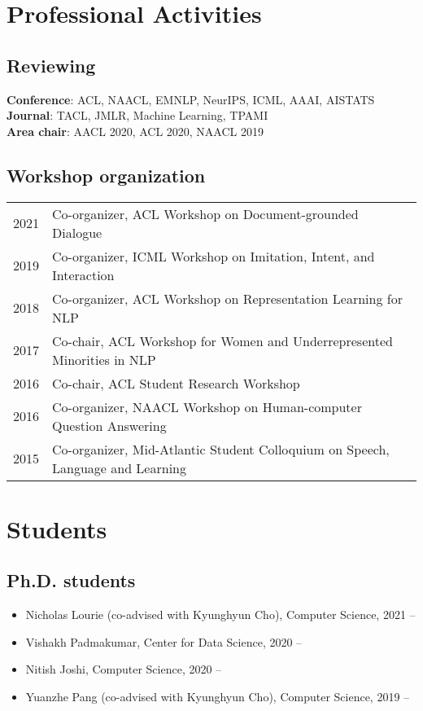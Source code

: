 \documentclass[a4paper,11pt]{article}
\begin{document}
\section{Professional Activities}
\subsection{Reviewing}
\textbf{Conference}: ACL, NAACL, EMNLP, NeurIPS, ICML, AAAI, AISTATS \\
\textbf{Journal}: TACL, JMLR, Machine Learning, TPAMI \\
\textbf{Area chair}: AACL 2020, ACL 2020, NAACL 2019

\subsection{Workshop organization}
\begin{longtable}{rl}
2021 & Co-organizer, ACL Workshop on Document-grounded Dialogue \\
2019 & Co-organizer, ICML Workshop on Imitation, Intent, and Interaction \\
2018 & Co-organizer, ACL Workshop on Representation Learning for NLP \\
2017 & Co-chair, ACL Workshop for Women and Underrepresented Minorities in NLP \\
2016 & Co-chair, ACL Student Research Workshop \\
2016 & Co-organizer, NAACL Workshop on Human-computer Question Answering \\
2015 & Co-organizer, Mid-Atlantic Student Colloquium on Speech, Language and Learning
\end{longtable}

\section{Students}
\subsection{Ph.D. students}
\begin{itemize}
    \item Nicholas Lourie (co-advised with Kyunghyun Cho), Computer Science, 2021 --
    \item Vishakh Padmakumar, Center for Data Science, 2020 --
    \item Nitish Joshi, Computer Science, 2020 --
    \item Yuanzhe Pang (co-advised with Kyunghyun Cho), Computer Science, 2019 --
\end{itemize}
\end{document}
